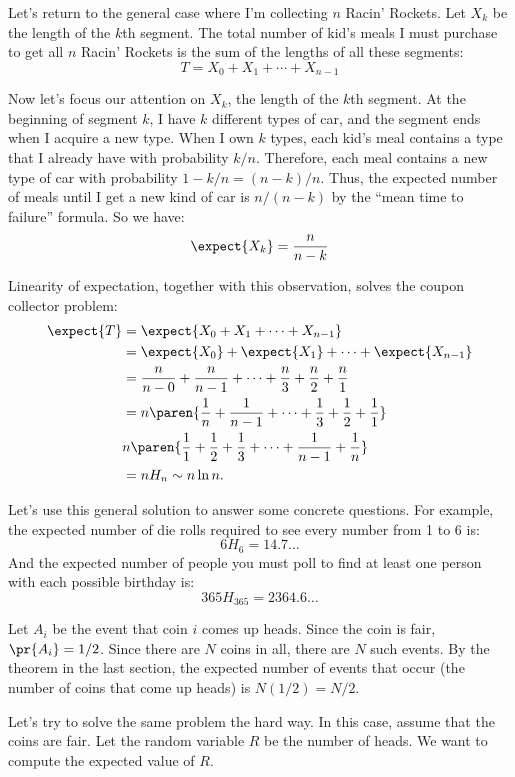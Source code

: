 Let's return to the general case where I'm collecting $n$ Racin'
Rockets.  Let $X_k$ be the length of the $k$th segment.  The total
number of kid's meals I must purchase to get all $n$ Racin' Rockets is
the sum of the lengths of all these segments:
%
\[
T = X_0 + X_1 + \cdots + X_{n-1}
\]

Now let's focus our attention on $X_k$, the length of the $k$th segment.
At the beginning of segment $k$, I have $k$ different types of car, and
the segment ends when I acquire a new type.  When I own $k$ types, each
kid's meal contains a type that I already have with probability $k / n$.
Therefore, each meal contains a new type of car with probability $1 - k /
n = (n - k) / n$.  Thus, the expected number of meals until I get a new
kind of car is $n / (n - k)$ by the ``mean time to failure'' formula.  So
we have:
%
\[
\expect{X_k} = \frac{n}{n - k}
\]

Linearity of expectation, together with this observation, solves the
coupon collector problem:
%
\begin{align*}
\expect{T} & = \expect{X_0 + X_1 + \cdots + X_{n-1}} \\ & = \expect{X_0} +
  \expect{X_1} + \cdots + \expect{X_{n-1}} \\ & = \frac{n}{n - 0} +
  \frac{n}{n - 1} + \cdots + \frac{n}{3} + \frac{n}{2} + \frac{n}{1} \\ &
  = n \paren{\frac{1}{n} + \frac{1}{n-1} + \cdots + \frac{1}{3} +
  \frac{1}{2} + \frac{1}{1}} \\ & n \paren{\frac{1}{1} + \frac{1}{2} +
  \frac{1}{3} + \cdots + \frac{1}{n-1} + \frac{1}{n}}\\
  & = n H_n \sim n \ln n.
\end{align*}

Let's use this general solution to answer some concrete questions.
For example, the expected number of die rolls required to see every
number from 1 to 6 is:
%
\[
6 H_6 = 14.7 \dots
\]
%
And the expected number of people you must poll to find at least one
person with each possible birthday is:
%
\[
365 H_{365} = 2364.6\dots
\]

\iffalse

Let $A_i$ be the event that coin $i$ comes up heads.
Since the coin is fair, $\pr{A_i} = 1/2$.  Since
there are $N$ coins in all, there are $N$ such events.  By the theorem
in the last section, the expected number of events that occur (the
number of coins that come up heads) is $N(1/2) =
N/2$.

Let's try to solve the same problem the hard way.  In this case,
assume that the coins are fair.  Let the random variable $R$ be the
number of heads.  We want to compute the expected value of $R$.

